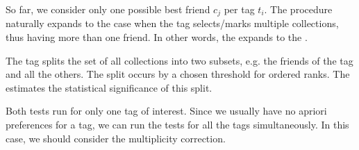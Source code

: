 So far, we consider only one possible best friend $c_j$ per tag $t_i$. The procedure naturally expands to the case when the tag selects/marks multiple collections, thus having more than one friend. In other words, the  expands to the .

The tag splits the set of all collections into two subsets, e.g. the friends of the tag and all the others. The split occurs by a chosen threshold for ordered ranks. The  estimates the statistical significance of this split.

Both tests run for only one tag of interest. Since we usually have no apriori preferences for a tag, we can run the tests for all the tags simultaneously. In this case, we should consider the multiplicity correction. 